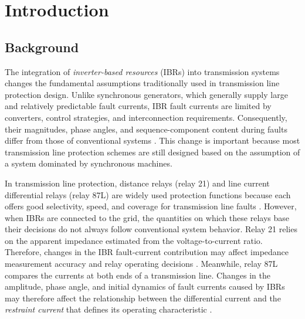 \chapter{Introduction}

\section{Background}

The integration of \textit{inverter-based resources} (IBRs) into transmission systems changes the fundamental assumptions traditionally used in transmission line protection design. Unlike synchronous generators, which generally supply large and relatively predictable fault currents, IBR fault currents are limited by converters, control strategies, and interconnection requirements. Consequently, their magnitudes, phase angles, and sequence-component content during faults differ from those of conventional systems \cite{haddadi2021systemprotection,kou2020fault,ieee2022std2800}. This change is important because most transmission line protection schemes are still designed based on the assumption of a system dominated by synchronous machines.

In transmission line protection, distance relays (relay 21) and line current differential relays (relay 87L) are widely used protection functions because each offers good selectivity, speed, and coverage for transmission line faults \cite{ieee2016c37113,ieee2015c37243}. However, when IBRs are connected to the grid, the quantities on which these relays base their decisions do not always follow conventional system behavior. Relay 21 relies on the apparent impedance estimated from the voltage-to-current ratio. Therefore, changes in the IBR fault-current contribution may affect impedance measurement accuracy and relay operating decisions \cite{ieee2016c37113,hooshyar2015cirepp1,fang2019impact}. Meanwhile, relay 87L compares the currents at both ends of a transmission line. Changes in the amplitude, phase angle, and initial dynamics of fault currents caused by IBRs may therefore affect the relationship between the differential current and the \textit{restraint current} that defines its operating characteristic \cite{ieee2015c37243,li2017analysis,chowdhury2023lcd}.

